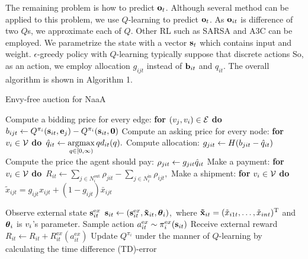 The remaining problem is how to predict $\mathrm{\mathbf{o}}_t$.
Although several method can be applied to this problem,
we use $Q$-learning to predict $\mathrm{\mathbf{o}}_t$.
As $\mathrm{\mathbf{o}}_{it}$ is difference of two $Q$s, we approximate each of $Q$.
Other RL such as SARSA and A3C can be employed.
We parametrize the state with a vector $\mathrm{\mathbf{s}}_t$ 
which contains input and weight.
$\epsilon$-greedy policy with $Q$-learning typically suppose that discrete actions
So, as an action, we employ allocation $g_{ijt}$ instead of $\mathrm{\mathbf{b}}_{it}$ and $q_{it}$.
The overall algorithm is shown in Algorithm 1.

\begin{algorithm}[t]
\caption{Envy-free auction for NaaA}
\begin{algorithmic}[1]
		\STATE Compute a bidding price for every edge: \textbf{for} $(v_j, v_i) \in \mathcal{E}$ \textbf{do}\
		$b_{ijt} \leftarrow Q^{\pi_i}( \mathrm{\mathbf{s}}_{it}, \mathrm{\mathbf{e}}_j) - Q^{\pi_i}( \mathrm{\mathbf{s}}_{it}, \mathrm{\mathbf{0}})$ 
		\STATE Compute an asking price for every node: \textbf{for} $\unit \in \units$ \textbf{do}\
		${\hat{q}}_{it} \leftarrow \mathop{\rm argmax}\limits_{q \in [0, \infty)} q d_{it}(q).$
		\FOR{$(v_i, v_j) \in \edges$}
				\STATE Compute allocation: $g_{jit} \leftarrow H(b_{jit} - {\hat{q}}_{it})$ 
				\STATE Compute the price the agent should pay: $\rho_{jit} \leftarrow g_{jit} {\hat{q}}_{it}$ 
		\ENDFOR
		\STATE Make a payment: \textbf{for} $\unit \in \units$ \textbf{do}\
		$R_{it} \leftarrow \sum_{j \in N^\mathrm{out}_i} \rho_{jit} 
				- \sum_{j \in N^\mathrm{in}_i} \rho_{ijt},$
		\STATE Make a shipment: \textbf{for} $\unit \in \units$ \textbf{do}\
		$\tilde{x}_{ijt} = g_{ijt} x_{ijt} + ( 1 - g_{ijt} ) \bar{x}_{ijt} $

		\FOR{$\unit \in \units$} 
			\STATE Observe external state $\mathrm{\mathbf{s}}_{it}^{\mathrm ex}$
			\STATE $\mathrm{\mathbf{s}}_{it} \leftarrow (\mathrm{\mathbf{s}}_{it}^{\mathrm ex}, \mathrm{\mathbf{\tilde{x}}}_{it}, \boldsymbol{\theta}_i)$,\
				where $\mathrm{\mathbf{\tilde{x}}}_{it} = (\tilde{x}_{i1t}, \dots, \tilde{x}_{int})^\mathrm{T}$ and\
				$\boldsymbol{\theta}_i$ is $v_{i}$'s parameter.
			\STATE Sample action $a_{it}^{\mathrm ex} \sim \pi_i^{\mathrm ex}(\mathrm{\mathbf{s}}_{it})$
			\STATE Receive external reward $R_{it} \leftarrow R_{it} + R_{it}^{\mathrm ex}(a_{it}^{\mathrm ex})$
			\STATE Update $Q^{\pi_i}$ under the manner of $Q$-learning by calculating the time difference (TD)-error 
		\ENDFOR
	\ENDFOR
\end{algorithmic}
\end{algorithm}


